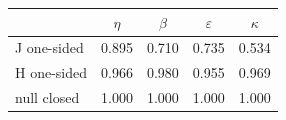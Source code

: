 \begin{tabular}{lcccc}
\toprule
 & $\eta$ & $\beta$ & $\varepsilon$ & $\kappa$ \\
\midrule
J one-sided & 0.895 & 0.710 & 0.735 & 0.534 \\
H one-sided & 0.966 & 0.980 & 0.955 & 0.969 \\
null closed & 1.000 & 1.000 & 1.000 & 1.000 \\
\bottomrule
\end{tabular}
